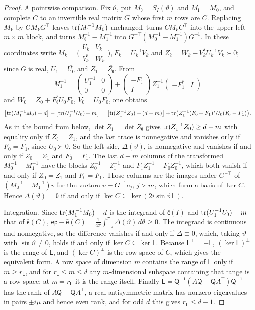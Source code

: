 \begin{proof}
A pointwise comparison. Fix $\vartheta$, put $M_0=S_I(\vartheta)$ and $M_1=\overline{M_0}$, and complete $C$ to an invertible real matrix $G$ whose first $m$ rows are $C$. Replacing $M_k$ by $GM_kG^\top$ leaves $\operatorname{tr}(M_1^{-1}M_0)$ unchanged, turns $CM_kC^\top$ into the upper left $m\times m$ block, and turns $M_0^{-1}-M_1^{-1}$ into $G^{-\top}(M_0^{-1}-M_1^{-1})G^{-1}$. In these coordinates write $M_k=\bigl(\begin{smallmatrix}U_k&V_k\\V_k^*&W_k\end{smallmatrix}\bigr)$, $F_k=U_k^{-1}V_k$ and $Z_k=W_k-V_k^*U_k^{-1}V_k\succ0$; since $G$ is real, $U_1=\overline{U_0}$ and $Z_1=\overline{Z_0}$. From
\[ M_1^{-1}=\begin{pmatrix}U_1^{-1}&0\\0&0\end{pmatrix}+\begin{pmatrix}-F_1\\I\end{pmatrix}Z_1^{-1}\begin{pmatrix}-F_1^*&I\end{pmatrix} \]
and $W_0=Z_0+F_0^*U_0F_0$, $V_0=U_0F_0$, one obtains
\[ \bigl[\operatorname{tr}(M_1^{-1}M_0)-d\bigr]-\bigl[\operatorname{tr}(U_1^{-1}U_0)-m\bigr]=\bigl[\operatorname{tr}(Z_1^{-1}Z_0)-(d-m)\bigr]+\operatorname{tr}\bigl(Z_1^{-1}(F_0-F_1)^*U_0(F_0-F_1)\bigr). \]
As in the bound from below, $\det Z_1=\det Z_0$ gives $\operatorname{tr}(Z_1^{-1}Z_0)\ge d-m$ with equality only if $Z_0=Z_1$, and the last trace is nonnegative and vanishes only if $F_0=F_1$, since $U_0\succ0$. So the left side, $\Delta(\vartheta)$, is nonnegative and vanishes if and only if $Z_0=Z_1$ and $F_0=F_1$. The last $d-m$ columns of the transformed $M_0^{-1}-M_1^{-1}$ have the blocks $Z_0^{-1}-Z_1^{-1}$ and $F_1Z_1^{-1}-F_0Z_0^{-1}$, which both vanish if and only if $Z_0=Z_1$ and $F_0=F_1$. Those columns are the images under $G^{-\top}$ of $(M_0^{-1}-M_1^{-1})v$ for the vectors $v=G^{-1}e_j$, $j>m$, which form a basis of $\ker C$. Hence $\Delta(\vartheta)=0$ if and only if $\ker C\subseteq\ker(2i\sin\vartheta\,\mathsf L)$.

Integration. Since $\operatorname{tr}(M_1^{-1}M_0)-d$ is the integrand of $\bar{\mathsf e}(I)$ and $\operatorname{tr}(U_1^{-1}U_0)-m$ that of $\bar{\mathsf e}(C)$, $\mathsf{ep}-\bar{\mathsf e}(C)=\frac1{4\pi}\int_{-\pi}^{\pi}\Delta(\vartheta)\,d\vartheta\ge0$. The integrand is continuous and nonnegative, so the difference vanishes if and only if $\Delta\equiv0$, which, taking $\vartheta$ with $\sin\vartheta\ne0$, holds if and only if $\ker C\subseteq\ker\mathsf L$. Because $\mathsf L^\top=-\mathsf L$, $(\ker\mathsf L)^\perp$ is the range of $\mathsf L$, and $(\ker C)^\perp$ is the row space of $C$, which gives the equivalent form. A row space of dimension $m$ contains the range of $\mathsf L$ only if $m\ge r_{\mathsf L}$, and for $r_{\mathsf L}\le m\le d$ any $m$-dimensional subspace containing that range is a row space; at $m=r_{\mathsf L}$ it is the range itself. Finally $\mathsf L=\mathsf Q^{-1}(A\mathsf Q-\mathsf QA^\top)\mathsf Q^{-1}$ has the rank of $A\mathsf Q-\mathsf QA^\top$, a real antisymmetric matrix has nonzero eigenvalues in pairs $\pm i\mu$ and hence even rank, and for odd $d$ this gives $r_{\mathsf L}\le d-1$.
\end{proof}

